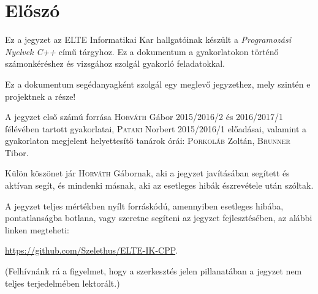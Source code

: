 \documentclass[../exercise_book/exercise_book.tex]{subfiles}
\begin{document}
	\section{Előszó}
	Ez a jegyzet az ELTE Informatikai Kar hallgatóinak készült a \emph{Programozási Nyelvek C++} című tárgyhoz. Ez a dokumentum a gyakorlatokon történő számonkéréshez és vizsgához szolgál gyakorló feladatokkal.
	
	\smallskip
	Ez a dokumentum segédanyagként szolgál egy meglevő jegyzethez, mely szintén e projektnek a része!
	
	\smallskip
	A jegyzet első számú forrása \textsc{Horváth} Gábor 2015/2016/2 és 2016/2017/1 félévében tartott gyakorlatai, \textsc{Pataki} Norbert 2015/2016/1 előadásai, valamint a gyakorlaton megjelent helyettesítő tanárok órái: \textsc{Porkoláb} Zoltán, \textsc{Brunner} Tibor.
	
	Külön köszönet jár \textsc{Horváth} Gábornak, aki a jegyzet javításában segített és aktívan segít, és mindenki másnak, aki az esetleges hibák észrevétele után szóltak.
	
	\smallskip
	A jegyzet teljes mértékben nyílt forráskódú, amennyiben esetleges hibába, pontatlanságba botlana, vagy szeretne segíteni az jegyzet fejlesztésében, az alábbi linken megteheti:
	
	\url{https://github.com/Szelethus/ELTE-IK-CPP}.
	
	(Felhívnánk rá a figyelmet, hogy a szerkesztés jelen pillanatában a jegyzet nem teljes terjedelmében lektorált.)
	
\end{document}
